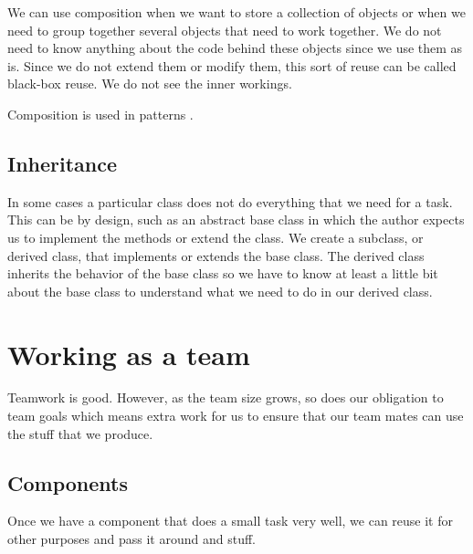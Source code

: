 We can use composition when we want to store a collection of 
objects or when we need to group together several objects that
need to work together.  We do not need to know anything about
the code behind these objects since we use them as is.  Since we do
not extend them or modify them, this sort of reuse can be called
black-box reuse.  We do not see the inner workings.

Composition is used in patterns .

        \subsection{Inheritance}

In some cases a particular class does not do everything that
we need for a task.  This can be by design, such as an abstract
base class in which the author expects us to implement
the methods or extend the class.  We create a subclass, or derived
class, that implements or extends the base class.  The derived class
inherits the behavior of the base class so we have to know at least
a little bit about the base class to understand what we need to 
do in our derived class.  

    \section{Working as a team}

Teamwork is good.  However, as the team size grows, so does our
obligation to team goals which means extra work for us to ensure
that our team mates can use the stuff that we produce.

        \subsection{Components}

Once we have a component that does a small task very well, we
can reuse it for other purposes and pass it around and stuff.
